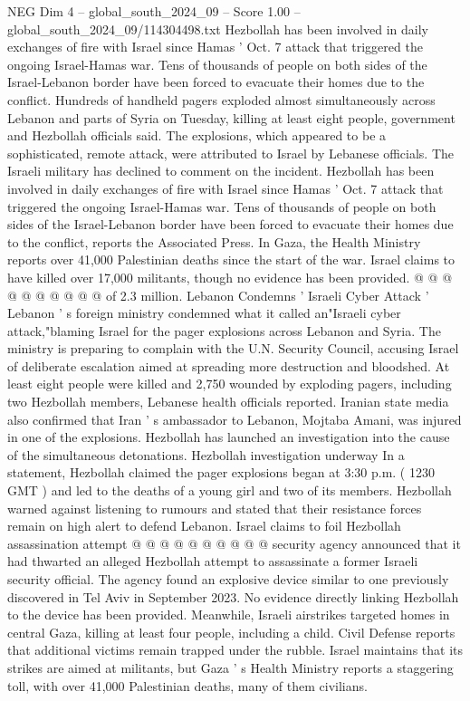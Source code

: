 \begin{textsample}{NEG Dim 4 – global\_south\_2024\_09 – Score 1.00 – global\_south\_2024\_09/114304498.txt}  \label{ex:f4_neg_170}
Hezbollah has been involved in daily exchanges of fire with Israel since Hamas ' Oct. 7 attack that triggered the ongoing Israel-Hamas war.
Tens of thousands of people on both sides of the Israel-Lebanon border have been forced to evacuate their homes due to the conflict.
Hundreds of handheld pagers exploded almost simultaneously across Lebanon and parts of Syria on Tuesday, killing at least eight people, government and Hezbollah officials said.
The explosions, which appeared to be a sophisticated, remote attack, were attributed to Israel by Lebanese officials.
The Israeli military has declined to comment on the incident.
Hezbollah has been involved in daily exchanges of fire with Israel since Hamas ' Oct. 7 attack that triggered the ongoing Israel-Hamas war.
Tens of thousands of people on both sides of the Israel-Lebanon border have been forced to evacuate their homes due to the conflict, reports the Associated Press.
In Gaza, the Health Ministry reports over 41,000 Palestinian deaths since the start of the war.
Israel claims to have killed over 17,000 militants, though no evidence has been provided. @ @ @ @ @ @ @ @ @ @ of 2.3 million.
Lebanon Condemns ' Israeli Cyber Attack ' Lebanon ' s foreign ministry condemned what it called an"Israeli cyber attack,"blaming Israel for the pager explosions across Lebanon and Syria.
The ministry is preparing to complain with the U.N.
Security Council, accusing Israel of deliberate escalation aimed at spreading more destruction and bloodshed.
At least eight people were killed and 2,750 wounded by exploding pagers, including two Hezbollah members, Lebanese health officials reported.
Iranian state media also confirmed that Iran ' s ambassador to Lebanon, Mojtaba Amani, was injured in one of the explosions.
Hezbollah has launched an investigation into the cause of the simultaneous detonations.
Hezbollah investigation underway In a statement, Hezbollah claimed the pager explosions began at 3:30 p.m. ( 1230 GMT ) and led to the deaths of a young girl and two of its members.
Hezbollah warned against listening to rumours and stated that their resistance forces remain on high alert to defend Lebanon.
Israel claims to foil Hezbollah assassination attempt @ @ @ @ @ @ @ @ @ @ security agency announced that it had thwarted an alleged Hezbollah attempt to assassinate a former Israeli security official.
The agency found an explosive device similar to one previously discovered in Tel Aviv in September 2023.
No evidence directly linking Hezbollah to the device has been provided.
Meanwhile, Israeli airstrikes targeted homes in central Gaza, killing at least four people, including a child.
Civil Defense reports that additional victims remain trapped under the rubble.
Israel maintains that its strikes are aimed at militants, but Gaza ' s Health Ministry reports a staggering toll, with over 41,000 Palestinian deaths, many of them civilians.

\end{textsample}
